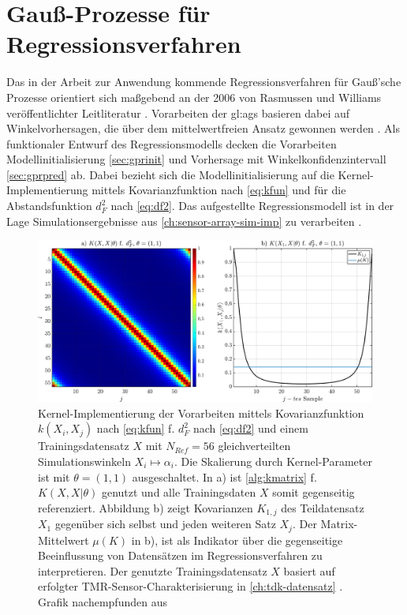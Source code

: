 
\section{Gauß-Prozesse für Regressionsverfahren}\label{sec:gauss-prozesse-regressionsverfahren}


Das in der Arbeit zur Anwendung kommende Regressionsverfahren für Gauß'sche Prozesse orientiert sich maßgebend an der 2006 von Rasmussen und Williams veröffentlichter Leitliteratur \cite{Rasmussen2006}. Vorarbeiten der \gls{gl:ags} \cite{Schuethe2020b}\cite{Schuethe2020} basieren dabei auf Winkelvorhersagen, die über dem mittelwertfreien Ansatz gewonnen werden \cite{Rasmussen2006}. Als funktionaler Entwurf des Regressionsmodells \cite{Schuethe2020} decken die Vorarbeiten Modellinitialisierung \autoref{sec:gprinit} und Vorhersage mit Winkelkonfidenzintervall \autoref{sec:gprpred} ab. Dabei bezieht sich die Modellinitialisierung auf die Kernel-Implementierung mittels Kovarianzfunktion nach \autoref{eq:kfun} und für die Abstandsfunktion $d_F^2$ nach \autoref{eq:df2}. Das aufgestellte Regressionsmodell ist in der Lage Simulationsergebnisse aus \autoref{ch:sensor-array-sim-imp} zu verarbeiten \cite{Schuethe2020b}\cite{Schuethe2020}. 


\vspace{2mm}
\begin{figure}[bph]
	\centering
	\includegraphics[width=\linewidth]{chapters/images/2-Grundlagen/Kernel-Vorabeiten-N56}
	\caption[Kernel-Implementierung der Vorarbeiten]{Kernel-Implementierung der Vorarbeiten mittels Kovarianzfunktion $k(X_i,X_j)$ nach \autoref{eq:kfun} f. $d_F^2$ nach \autoref{eq:df2} und einem Trainingsdatensatz $X$ mit $N_{Ref} = 56$ gleichverteilten Simulationswinkeln $X_i \mapsto \alpha_i$. Die Skalierung durch Kernel-Parameter ist mit $\theta = (1,1)$ ausgeschaltet. In a) ist \autoref{alg:kmatrix} f. $K(X,X|\theta)$ genutzt und alle Trainingsdaten $X$ somit gegenseitig referenziert. Abbildung b) zeigt Kovarianzen $K_{1,j}$ des Teildatensatz $X_1$ gegenüber sich selbst und jeden weiteren Satz $X_j$. Der Matrix-Mittelwert $\mu(K)$ in b), ist als Indikator über die gegenseitige Beeinflussung von Datensätzen im Regressionsverfahren zu interpretieren. Der genutzte Trainingsdatensatz $X$ basiert auf erfolgter TMR-Sensor-Charakterisierung in \autoref{ch:tdk-datensatz} \cite{TDK2016}\cite{Schuethe2019}. Grafik nachempfunden aus \cite{Lang2014}}
	\label{fig:kernel-vorabeiten-n56}
\end{figure}


